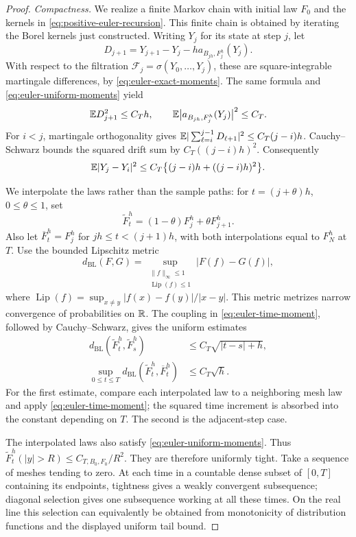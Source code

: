 \begin{proof}
\emph{Compactness.}
We realize a finite Markov chain with initial law \(F_0\) and the kernels in \eqref{eq:positive-euler-recursion}.
This finite chain is obtained by iterating the Borel kernels just constructed.
Writing \(Y_j\) for its state at step \(j\), let
\[
 D_{j+1}
  =Y_{j+1}-Y_j-h a_{B_{jh},F_j^h}(Y_j).
 \]
With respect to the filtration $\mathcal F_j=\sigma(Y_0,\ldots,Y_j)$, these are square-integrable martingale differences, by \eqref{eq:euler-exact-moments}.
The same formula and \eqref{eq:euler-uniform-moments} yield
\[
 \mathbb E D_{j+1}^2\le C_T h,
 \qquad
 \mathbb E\bigl|a_{B_{jh},F_j^h}(Y_j)\bigr|^2\le C_T.
 \]
For \(i<j\), martingale orthogonality gives \(\mathbb E|\sum_{\ell=i}^{j-1}D_{\ell+1}|^2\le C_T(j-i)h\).
Cauchy--Schwarz bounds the squared drift sum by \(C_T((j-i)h)^2\).
Consequently
\begin{equation}
 \mathbb E|Y_j-Y_i|^2
   \le C_T\bigl\{(j-i)h+((j-i)h)^2\bigr\}.
 \label{eq:euler-time-moment}
\end{equation}

We interpolate the laws rather than the sample paths: for \(t=(j+\theta)h\), \(0\le\theta\le1\), set
\[
 \widetilde F_t^h=(1-\theta)F_j^h+\theta F_{j+1}^h.
 \]
Also let \(\overline F_t^h=F_j^h\) for \(jh\le t<(j+1)h\), with both interpolations equal to \(F_N^h\) at \(T\).
Use the bounded Lipschitz metric
\[
 d_{\mathrm{BL}}(F,G)
 =\sup_{\substack{\|f\|_\infty\le1\\ \operatorname{Lip}(f)\le1}}
                  |F(f)-G(f)|,
 \]
where $\operatorname{Lip}(f)=\sup_{x\ne y}|f(x)-f(y)|/|x-y|$.
This metric metrizes narrow convergence of probabilities on \(\mathbb R\).
The coupling in \eqref{eq:euler-time-moment}, followed by Cauchy--Schwarz, gives the uniform estimates
\begin{equation}
 \begin{split}
 d_{\mathrm{BL}}(\widetilde F_t^h,\widetilde F_s^h)
      &\le C_T\sqrt{|t-s|+h},\\
 \sup_{0\le t\le T}
 d_{\mathrm{BL}}(\widetilde F_t^h,\overline F_t^h)
      &\le C_T\sqrt h .
 \end{split}
 \label{eq:euler-time-modulus}
\end{equation}
For the first estimate, compare each interpolated law to a neighboring mesh law and apply \eqref{eq:euler-time-moment}; the squared time increment is absorbed into the constant depending on \(T\).
The second is the adjacent-step case.

The interpolated laws also satisfy \eqref{eq:euler-uniform-moments}. Thus \(\widetilde F_t^h(|y|>R)\le C_{T,B_0,F_0}/R^2\).
They are therefore uniformly tight.
Take a sequence of meshes tending to zero.
At each time in a countable dense subset of \([0,T]\) containing its endpoints, tightness gives a weakly convergent subsequence; diagonal selection gives one subsequence working at all these times.
On the real line this selection can equivalently be obtained from monotonicity of distribution functions and the displayed uniform tail bound.


\end{proof}
